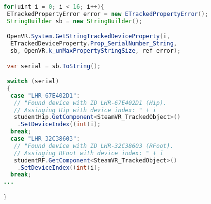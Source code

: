 \begin{lstlisting}[language=JAVA, frame=single]
for(uint i = 0; i < 16; i++){
 ETrackedPropertyError error = new ETrackedPropertyError();
 StringBuilder sb = new StringBuilder();

 OpenVR.System.GetStringTrackedDeviceProperty(i,
  ETrackedDeviceProperty.Prop_SerialNumber_String, 
  sb, OpenVR.k_unMaxPropertyStringSize, ref error);

 var serial = sb.ToString();

 switch (serial)
 {
  case "LHR-67E402D1":
   // "Found device with ID LHR-67E402D1 (Hip).
   // Assinging Hip with device index: " + i
   studentHip.GetComponent<SteamVR_TrackedObject>()
    .SetDeviceIndex((int)i);
  break;
  case "LHR-32C38603":
   // "Found device with ID LHR-32C38603 (RFoot).
   // Assinging RFoot with device index: " + i
   studentRF.GetComponent<SteamVR_TrackedObject>()
    .SetDeviceIndex((int)i);
  break;
...

}
\end{lstlisting}

